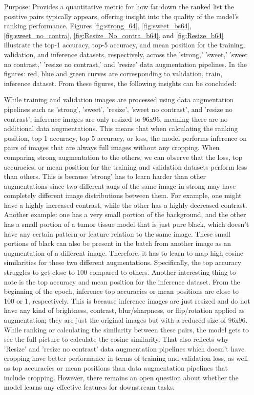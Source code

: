 Purpose: Provides a quantitative metric for how far down the ranked list the  positive pairs typically appears, offering insight into the quality of the model's ranking performance.
Figures \ref{fig:strong_64}, \ref{fig:sweet_bs64}, \ref{fig:sweet_no_contra}, \ref{fig:Resize_No_contra_b64}, and \ref{fig:Resize_b64} illustrate the top-1 accuracy, top-5 accuracy, and mean position for the training, validation, and inference datasets, respectively, across the 'strong,' 'sweet,' 'sweet no contrast,' 'resize no contrast,' and 'resize' data augmentation pipelines. In the figures: red, blue and green curves are corresponding to validation, train, inference dataset.  From these figures, the following insights can be concluded:

While training and validation images are processed using data augmentation pipelines such as 'strong', 'sweet', 'resize', 'sweet no contrast', and 'resize no contrast', inference images are only resized to 96x96, meaning there are no additional data augmentations. This means that when calculating the ranking position, top 1 accuracy, top 5 accuracy, or loss, the model performs inference on pairs of images that are always full images without any cropping. When comparing strong augmentation to the others, we can observe that the loss, top accuracies, or mean position for the training and validation datasets perform less than others. This is because 'strong' has to learn harder than other augmentations since two different augs of the same image in strong may have completely different image distributions between them. For example, one might have a highly increased contrast, while the other has a highly decreased contrast. Another example: one has a very small portion of the background, and the other has a small portion of a tumor tissue model that is just pure black, which doesn't have any certain pattern or feature relation to the same image. These small portions of black can also be present in the batch from another image as an augmentation of a different image. Therefore, it has to learn to map high cosine similarities for these two different augmentations. Specifically, the top accuracy struggles to get close to 100 compared to others. Another interesting thing to note is the top accuracy and mean position for the inference dataset. From the beginning of the epoch, inference top accuracies or mean positions are close to 100 or 1, respectively. This is because inference images are just resized and do not have any kind of brightness, contrast, blur/sharpness, or flip/rotation applied as augmentation; they are just the original images but with a reduced size of 96x96. While ranking or calculating the similarity between these pairs, the model gets to see the full picture to calculate the cosine similarity. That also reflects why 'Resize' and 'resize no contrast' data augmentation pipelines which doesn't have cropping have better performance in terms of training and validation loss, as well as top accuracies or mean positions than data augmentation pipelines that include cropping. However, there remains an open question about whether the model learns any effective features for downstream tasks.
